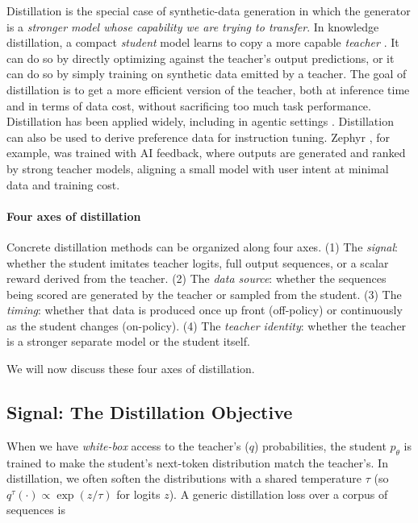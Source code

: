 Distillation is the special case of synthetic-data generation in which the generator is a \emph{stronger model whose capability we are trying to transfer}. In knowledge distillation, a compact \emph{student} model learns to copy a more capable \emph{teacher} \citep{hinton2015distilling, hu2022teacherstudentarchitectureknowledgelearning}. It can do so by directly optimizing against the teacher's output predictions, or it can do so by simply training on synthetic data emitted by a teacher. The goal of distillation is to get a more efficient version of the teacher, both at inference time and in terms of data cost, without sacrificing too much task performance. Distillation has been applied widely, including in agentic settings \citep[e.g.,][]{li2025chainofagentsendtoendagentfoundation, du-etal-2025-agentic}. Distillation can also be used to derive preference data for instruction tuning. Zephyr \citep{tunstall2024zephyr}, for example, was trained with AI feedback, where outputs are generated and ranked by strong teacher models, aligning a small model with user intent at minimal data and training cost.

\paragraph{Four axes of distillation}
Concrete distillation methods can be organized along four axes.
(1) The \emph{signal}: whether the student imitates teacher logits, full output sequences, or a scalar reward derived from the teacher.
(2) The \emph{data source}: whether the sequences being scored are generated by the teacher or sampled from the student.
(3) The \emph{timing}: whether that data is produced once up front (off-policy) or continuously as the student changes (on-policy).
(4) The \emph{teacher identity}: whether the teacher is a stronger separate model or the student itself.

We will now discuss these four  axes of distillation.

\subsection{Signal: The Distillation Objective}
When we have \emph{white-box} access to the teacher's ($q$) probabilities, the student $p_\theta$ is trained to make the student's next-token distribution match the teacher's. In distillation, we often soften the distributions with a shared temperature $\tau$ (so $q^{\tau}(\cdot) \propto \exp(z/\tau)$ for logits $z$). A generic distillation loss over a corpus of sequences is

